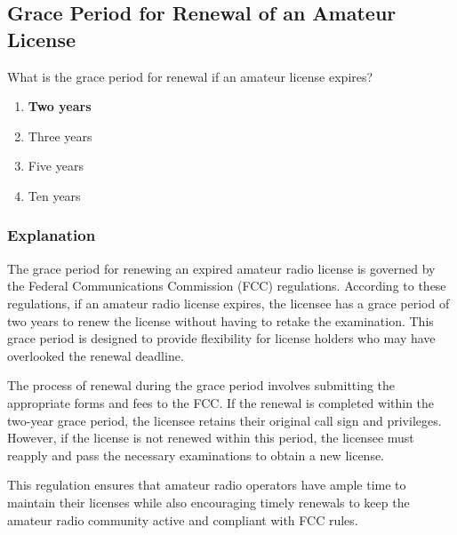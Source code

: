 \subsection{Grace Period for Renewal of an Amateur License}
\label{T1C09}

\begin{tcolorbox}[colback=gray!10!white,colframe=black!75!black,title=T1C09]
What is the grace period for renewal if an amateur license expires?
\begin{enumerate}[label=\Alph*)]
    \item \textbf{Two years}
    \item Three years
    \item Five years
    \item Ten years
\end{enumerate}
\end{tcolorbox}

\subsubsection{Explanation}
The grace period for renewing an expired amateur radio license is governed by the Federal Communications Commission (FCC) regulations. According to these regulations, if an amateur radio license expires, the licensee has a grace period of two years to renew the license without having to retake the examination. This grace period is designed to provide flexibility for license holders who may have overlooked the renewal deadline.

The process of renewal during the grace period involves submitting the appropriate forms and fees to the FCC. If the renewal is completed within the two-year grace period, the licensee retains their original call sign and privileges. However, if the license is not renewed within this period, the licensee must reapply and pass the necessary examinations to obtain a new license.

This regulation ensures that amateur radio operators have ample time to maintain their licenses while also encouraging timely renewals to keep the amateur radio community active and compliant with FCC rules.